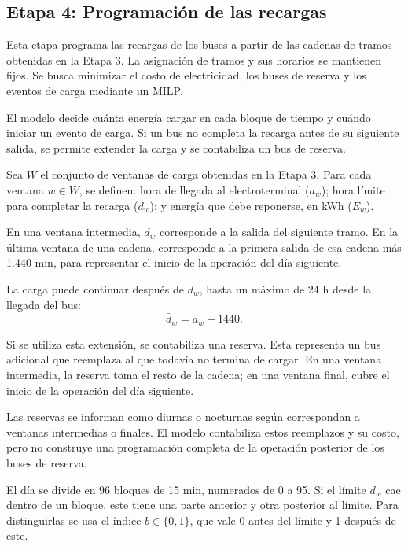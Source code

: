 \subsection{Etapa 4: Programación de las recargas}
\label{sec:etapa4}

Esta etapa programa las recargas de los buses a partir de las
cadenas de tramos obtenidas en la Etapa 3. La asignación de
tramos y sus horarios se mantienen fijos. Se busca minimizar
el costo de electricidad, los buses de reserva y los eventos
de carga mediante un MILP.

El modelo decide cuánta energía cargar en cada bloque de tiempo
y cuándo iniciar un evento de carga. Si un bus no completa
la recarga antes de su siguiente salida, se permite extender la carga y se contabiliza un bus de reserva.

Sea $W$ el conjunto de ventanas de carga obtenidas en la Etapa 3. Para cada ventana $w\in W$, se definen: hora de llegada al electroterminal ($a_w$); hora límite para completar la recarga ($d_w$); y energía que debe reponerse, en kWh ($E_w$).

En una ventana intermedia, $d_w$ corresponde a la salida del
siguiente tramo. En la última ventana de una cadena,
corresponde a la primera salida de esa cadena más 1.440 min,
para representar el inicio de la operación del día siguiente.


La carga puede continuar después de $d_w$, hasta un máximo de
24 h desde la llegada del bus:
\begin{equation}
\bar{d}_w=a_w+1440.
\end{equation}

Si se utiliza esta extensión, se contabiliza una reserva.
Esta representa un bus adicional que reemplaza al que todavía
no termina de cargar. En una ventana intermedia, la reserva
toma el resto de la cadena; en una ventana final, cubre el
inicio de la operación del día siguiente.

Las reservas se informan como diurnas o nocturnas según
correspondan a ventanas intermedias o finales. El modelo
contabiliza estos reemplazos y su costo, pero no construye
una programación completa de la operación posterior de
los buses de reserva.

El día se divide en 96 bloques de 15 min, numerados de 0 a 95. Si el límite $d_w$ cae dentro de un bloque, este tiene una parte anterior y otra posterior al límite. Para distinguirlas se usa el índice $b\in\{0,1\}$, que vale 0 antes del límite y 1 después de este.

